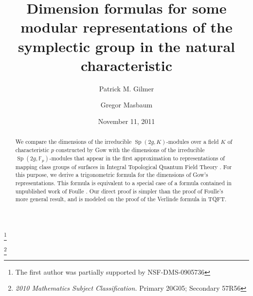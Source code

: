 \documentclass{amsart}
\begin{document}
  
  \title[Dimension formulas for some modular representations]
 {Dimension formulas for some modular representations of the
  symplectic group in the natural characteristic} 

 
\author{ Patrick M. Gilmer}
\address{Department of Mathematics\\
Louisiana State University\\
Baton Rouge, LA 70803\\
USA}
\thanks{The first author was partially supported by  NSF-DMS-0905736 }

\author{Gregor Masbaum}
\address{Institut de Math{\'e}matiques de Jussieu (UMR 7586 du CNRS)\\
Case 247, 
4 pl. Jussieu, 
75252 Paris Cedex 5,
FRANCE }

\thanks{{ \em 2010 Mathematics Subject Classification.} Primary 20G05;  Secondary 57R56}

\date{November 11, 2011}

 \begin{abstract} We compare the dimensions of the
irreducible  $\operatorname{Sp}(2g,K)$-modules over a field $K$ of characteristic
$p$ constructed by Gow \cite{Go} with 
the dimensions of
the irreducible   $\operatorname{Sp}(2g,{{\mathbb{F}}}_p)$-modules that appear  in the
 first approximation to
representations of mapping class groups of surfaces in Integral
Topological Quantum Field Theory \cite{GM4}.  For this purpose, we derive a 
trigonometric  formula for the dimensions of Gow's representations.
 This formula is equivalent to a special case of a  formula contained in unpublished work of Foulle
\cite{F1,F2}.  Our direct proof is simpler than the proof of Foulle's more
general result, and is modeled on the proof of the  Verlinde formula in TQFT. \end{abstract}

\maketitle
\end{document}

